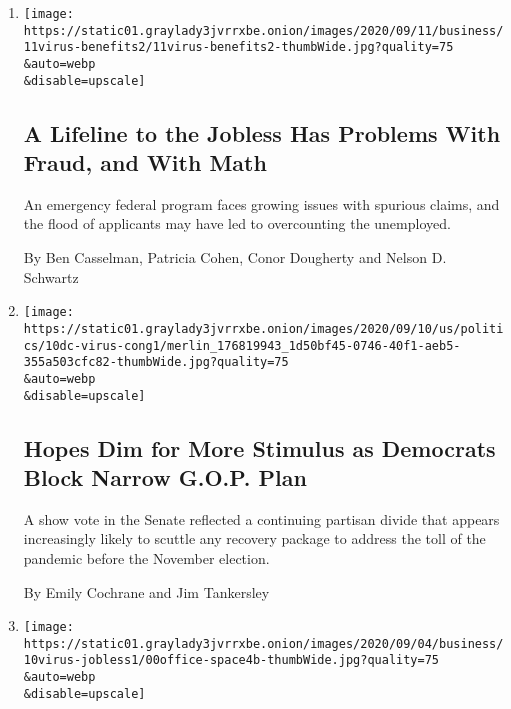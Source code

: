 \begin{enumerate}
\def\labelenumi{\arabic{enumi}.}
\item
  \href{/2020/09/11/business/economy/pandemic-unemployment-assistance-fraud.html}{}

  \texttt{[image: https://static01.graylady3jvrrxbe.onion/images/2020/09/11/business/11virus-benefits2/11virus-benefits2-thumbWide.jpg?quality=75\\\&auto=webp\\\&disable=upscale]}

  \hypertarget{a-lifeline-to-the-jobless-has-problems-with-fraud-and-with-math}{%
  \subsection{A Lifeline to the Jobless Has Problems With Fraud, and
  With
  Math}\label{a-lifeline-to-the-jobless-has-problems-with-fraud-and-with-math}}

  An emergency federal program faces growing issues with spurious
  claims, and the flood of applicants may have led to overcounting the
  unemployed.

  By Ben Casselman, Patricia Cohen, Conor Dougherty and Nelson D.
  Schwartz
\item
  \href{/2020/09/10/us/politics/second-stimulus-check.html}{}

  \texttt{[image: https://static01.graylady3jvrrxbe.onion/images/2020/09/10/us/politics/10dc-virus-cong1/merlin\_176819943\_1d50bf45-0746-40f1-aeb5-355a503cfc82-thumbWide.jpg?quality=75\\\&auto=webp\\\&disable=upscale]}

  \hypertarget{hopes-dim-for-more-stimulus-as-democrats-block-narrow-gop-plan}{%
  \subsection{Hopes Dim for More Stimulus as Democrats Block Narrow
  G.O.P.
  Plan}\label{hopes-dim-for-more-stimulus-as-democrats-block-narrow-gop-plan}}

  A show vote in the Senate reflected a continuing partisan divide that
  appears increasingly likely to scuttle any recovery package to address
  the toll of the pandemic before the November election.

  By Emily Cochrane and Jim Tankersley
\item
  \href{/2020/09/10/business/economy/unemployment-claims.html}{}

  \texttt{[image: https://static01.graylady3jvrrxbe.onion/images/2020/09/04/business/10virus-jobless1/00office-space4b-thumbWide.jpg?quality=75\\\&auto=webp\\\&disable=upscale]}


\end{enumerate}
